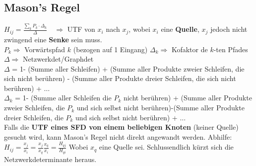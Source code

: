 \subsection{Mason's Regel }
  $\boxed{H_{ij} = \frac{\sum\limits_k P_k\cdot\Delta_k}{\Delta}}\quad
  \Rightarrow$ UTF von $x_i$ nach $x_j$, wobei \textbf{$x_i$} eine
  \textbf{Quelle}, \textbf{$x_j$} jedoch nicht zwingend eine \textbf{Senke} sein
  muss. \vspace{0.3cm}\\
  $P_k \Rightarrow$ Vorwärtspfad $k$ (bezogen auf 1 Eingang) \qquad $\Delta_k \Rightarrow$ Kofaktor de
  $k$-ten Pfades \qquad $\Delta \Rightarrow$ Netzwerkdet/Graphdet\vspace{0.3cm}\\
  $\Delta$ = 1- (Summe aller Schleifen) + (Summe aller Produkte zweier
  Schleifen, die sich nicht berühren) - (Summe
  aller Produkte dreier Schleifen, die sich nicht berühren) + $\ldots$
  \vspace{0.3cm}\\
  $\Delta_k$ = 1- (Summe aller Schleifen die $P_k$ nicht berühren) + (Summe
  aller Produkte zweier Schleifen, die $P_k$ und sich selbst nicht
  berühren)-(Summe aller Produkte dreier Schleifen, die $P_k$ und sich selbst
  nicht berühren) + $\ldots$ \\

  Falls die \textbf{UTF eines SFD von einem beliebigen Knoten} (keiner Quelle)
  gesucht wird, kann Mason's Regel nicht direkt angewandt werden. Abhilfe: \\
  $\boxed{H_{ij} = \frac{x_j}{x_i} = \frac{x_j}{x_q} \frac{x_q}{x_i} =
  \frac{H_{qj}}{H_{qi}}}$ Wobei $x_q$ eine Quelle sei. 
  Schlussendlich kürzt sich die Netzwerkdeterminante heraus. \\

